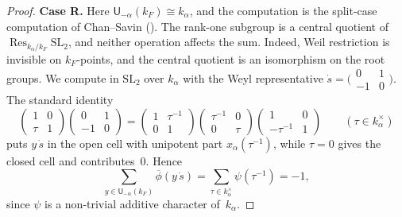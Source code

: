 \documentclass[11pt]{amsart}
\theoremstyle{definition}
\theoremstyle{remark}
\DeclareMathOperator{\Res}{Res}
\newcommand{\barr}[1]{\overline{#1}}
\begin{document}
\begin{proof}
\smallskip
\noindent\textbf{Case R.} Here $\mathsf{U}_{-\alpha}(k_F) \cong k_\alpha$, and the computation is the split-case computation of Chan--Savin (\cite[proof of Lem.~4.3]{CS}). The rank-one subgroup is a central quotient of $\Res_{k_\alpha/k_F}\mathrm{SL}_2$, and neither operation affects the sum. Indeed, Weil restriction is invisible on $k_F$-points, and the central quotient is an isomorphism on the root groups. We compute in $\mathrm{SL}_2$ over $k_\alpha$ with the Weyl representative $\dot{s} = \bigl(\begin{smallmatrix}0&1\\-1&0\end{smallmatrix}\bigr)$. The standard identity
\[
\begin{pmatrix}1&0\\ \tau&1\end{pmatrix}
\begin{pmatrix}0&1\\ -1&0\end{pmatrix}
= \begin{pmatrix}1& \tau^{-1}\\ 0&1\end{pmatrix}
\begin{pmatrix}\tau^{-1}&0\\ 0&\tau\end{pmatrix}
\begin{pmatrix}1&0\\ -\tau^{-1}&1\end{pmatrix}
\qquad (\tau \in k_\alpha^\times)
\]
puts $y\,\dot{s}$ in the open cell with unipotent part $x_\alpha(\tau^{-1})$, while $\tau = 0$ gives the closed cell and contributes~$0$. Hence
\[
\sum_{y\in\mathsf{U}_{-\alpha}(k_F)} \barr{\phi}(y\,\dot{s})
= \sum_{\tau\in k_\alpha^\times} \psi(\tau^{-1})
= -1,
\]
since $\psi$ is a non-trivial additive character of~$k_\alpha$.


\end{proof}
\end{document}
